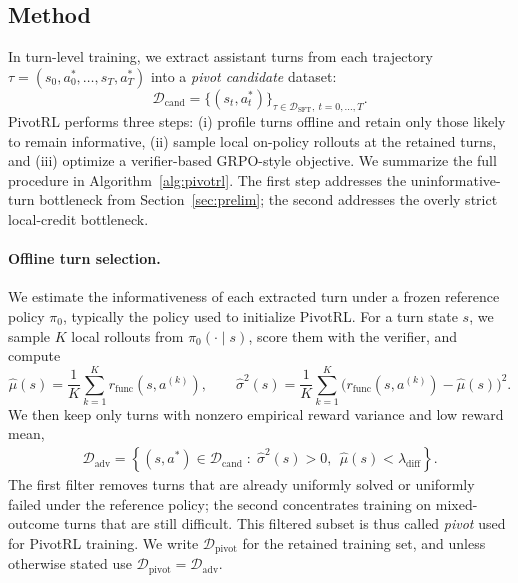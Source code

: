 \subsection{Method}
\label{sec:pivotrl_method}

In turn-level training, we extract assistant turns from each trajectory $\tau=(s_0,a_0^*,\ldots,s_T,a_T^*)$ into a \emph{pivot candidate} dataset:
\begin{equation}
\mathcal{D}_{\mathrm{cand}}=\{(s_t,a_t^*)\}_{\tau \in \mathcal{D}_{\mathrm{SFT}}, ~t = 0,\dots,T}.
\label{eq:cand}
\end{equation}
PivotRL performs three steps: (i) profile turns offline and retain only those likely to remain informative, (ii) sample local on-policy rollouts at the retained turns, and (iii) optimize a verifier-based GRPO-style objective. We summarize the full procedure in Algorithm~\ref{alg:pivotrl}. The first step addresses the uninformative-turn bottleneck from Section~\ref{sec:prelim}; the second addresses the overly strict local-credit bottleneck.

\paragraph{Offline turn selection.}
We estimate the informativeness of each extracted turn under a frozen reference policy $\pi_0$, typically the policy used to initialize PivotRL. For a turn state $s$, we sample $K$ local rollouts from $\pi_0(\cdot\mid s)$, score them with the verifier, and compute
\begin{equation}
\hat{\mu}(s)
=
\frac{1}{K}\sum_{k=1}^K r_{\mathrm{func}}(s,a^{(k)}),
\qquad
\hat{\sigma}^2(s)
=
\frac{1}{K}\sum_{k=1}^K \bigl(r_{\mathrm{func}}(s,a^{(k)})-\hat{\mu}(s)\bigr)^2.
\label{eq:profile_stats}
\end{equation}
We then keep only turns with nonzero empirical reward variance and low reward mean, 
\begin{align}
\mathcal{D}_{\mathrm{adv}}
=
\left\{
(s,a^*)\in \mathcal{D}_{\mathrm{cand}}
\;:\;
\hat{\sigma}^2(s)>0, ~~
\hat{\mu}(s)<\lambda_{\mathrm{diff}}
\right\}.
\label{eq:dadv}
\end{align}
The first filter removes turns that are already uniformly solved or uniformly failed under the reference policy; the second concentrates training on mixed-outcome turns that are still difficult. This filtered subset is thus called \emph{pivot} used for PivotRL training.
We write $\mathcal{D}_{\mathrm{pivot}}$ for the retained training set, and unless otherwise stated use $\mathcal{D}_{\mathrm{pivot}}=\mathcal{D}_{\mathrm{adv}}$.

